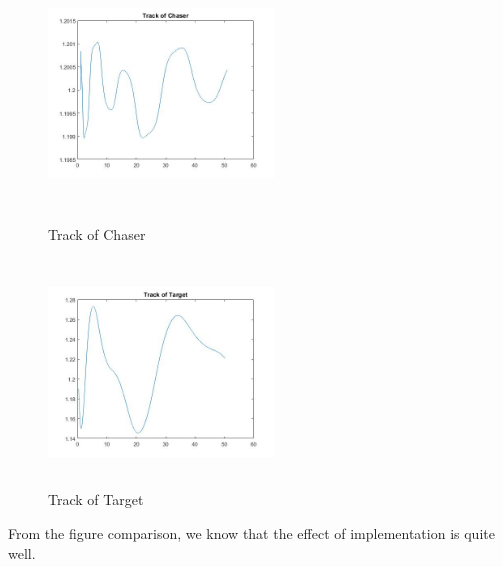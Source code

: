 \begin{figure}[htbp]
\centering
\begin{minipage}[t]{0.48\textwidth}
\centering
\includegraphics[width=6cm,height=6cm]{fig/simulation/ThrustStable/TrackofChaser.jpg}
\caption{Track of Chaser}
\end{minipage}
\begin{minipage}[t]{0.48\textwidth}
\centering
\includegraphics[width=6cm,height=6cm]{fig/simulation/ThrustStable/Trackoftarget.jpg}
\caption{Track of Target}
\end{minipage}
\end{figure}

From the figure comparison, we know that the effect of implementation is quite well.


\newpage
